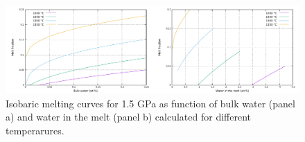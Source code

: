 \documentclass[hidelinks,11pt,a4paper]{article}
\begin{document}
\begin{figure}
\noindent\includegraphics[width=\textwidth]{./Figures/Water.pdf}
\caption{Isobaric melting curves for 1.5 GPa as function of bulk water (panel a) and water in the melt (panel b) calculated for different temperarures.}
\label{fig:water}
\end{figure}

\clearpage


\end{document}
